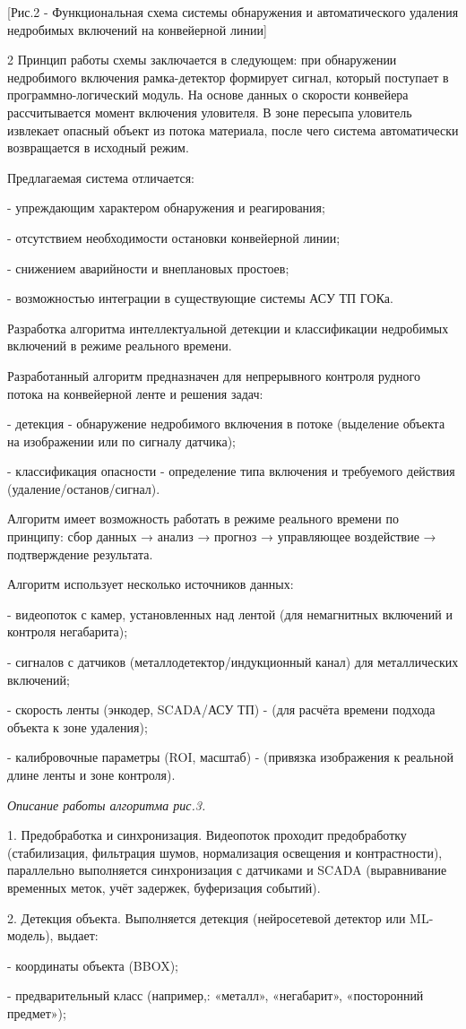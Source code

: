 [Рис.2 - Функциональная схема системы обнаружения и
автоматического удаления недробимых включений на конвейерной линии]

\begin{multicols}{2}
Принцип работы схемы заключается в следующем: при обнаружении
недробимого включения рамка-детектор формирует сигнал, который поступает
в программно-логический модуль. На основе данных о скорости конвейера
рассчитывается момент включения уловителя. В зоне пересыпа уловитель
извлекает опасный объект из потока материала, после чего система
автоматически возвращается в исходный режим.

Предлагаемая система отличается:

- упреждающим характером обнаружения и реагирования;

- отсутствием необходимости остановки конвейерной линии;

- снижением аварийности и внеплановых простоев;

- возможностью интеграции в существующие системы АСУ ТП ГОКа.

Разработка алгоритма интеллектуальной детекции и классификации
недробимых включений в режиме реального времени.

Разработанный алгоритм предназначен для непрерывного контроля рудного
потока на конвейерной ленте и решения задач:

- детекция - обнаружение недробимого включения в потоке (выделение
объекта на изображении или по сигналу датчика);

- классификация опасности - определение типа включения и
требуемого действия (удаление/останов/сигнал).

Алгоритм имеет возможность работать в режиме реального времени по
принципу: сбор данных → анализ → прогноз → управляющее воздействие →
подтверждение результата.

Алгоритм использует несколько источников данных:

- видеопоток с камер, установленных над лентой (для немагнитных
включений и контроля негабарита);

- сигналов с датчиков (металлодетектор/индукционный канал) для
металлических включений;

- скорость ленты (энкодер, SCADA/АСУ ТП) - (для расчёта времени
подхода объекта к зоне удаления);

- калибровочные параметры (ROI, масштаб) - (привязка
изображения к реальной длине ленты и зоне контроля).

\emph{Описание работы алгоритма рис.3.}

1. Предобработка и синхронизация. Видеопоток проходит предобработку
(стабилизация, фильтрация шумов, нормализация освещения и
контрастности), параллельно выполняется синхронизация с датчиками и
SCADA (выравнивание временных меток, учёт задержек, буферизация
событий).

2. Детекция объекта. Выполняется детекция (нейросетевой детектор или
ML-модель), выдает:

- координаты объекта (BBOX);

- предварительный класс (например,: «металл», «негабарит», «посторонний
предмет»);
\end{multicols}

